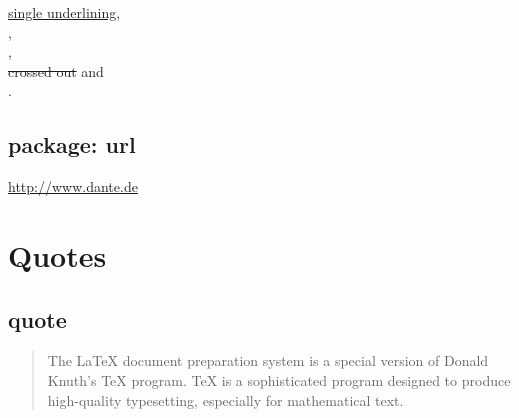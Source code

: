 \begin{filecontents*}{\democodefile}
\uline{single underlining}, \\
, \\
, \\
\sout{crossed out} and \\
.
\end{filecontents*}

%

\subsection{package: url}

\begin{filecontents*}{\democodefile}
\url{http://www.dante.de}
\end{filecontents*}

%

%
\section{Quotes}
\label{sec:demo:quote}

\subsection{quote}

\begin{filecontents*}{\democodefile}
\begin{quote}
The \LaTeX{} document preparation system is a special version of Donald
Knuth's \TeX{} program. \TeX{} is a sophisticated program designed to 
produce high-quality typesetting, especially for mathematical text.
\end{quote}
\end{filecontents*}

